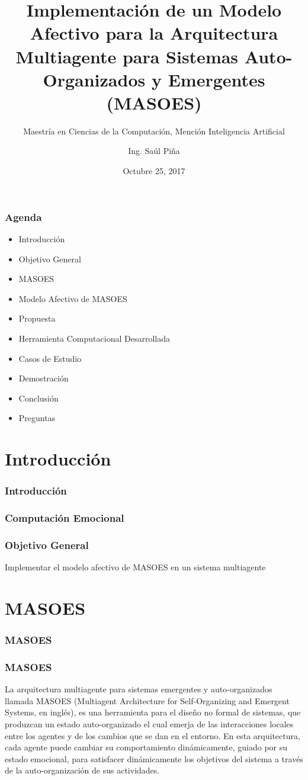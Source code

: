 \documentclass{beamer}
\title{Implementación de un Modelo Afectivo para la Arquitectura Multiagente para Sistemas Auto-Organizados y Emergentes (MASOES)}
\subtitle{Maestría en Ciencias de la Computación, Mención Inteligencia Artificial}
\author{Ing. Saúl Piña}
\date{Octubre 25, 2017}
\institute{\url{sauljabin@gmail.com}}
\begin{document}
\begin{frame}[plain,t]
\titlepage
\end{frame}

\begin{frame}
\frametitle{Agenda}
\begin{itemize}
\item Introducción
\item Objetivo General
\item MASOES
\item Modelo Afectivo de MASOES
\item Propuesta
\item Herramienta Computacional Desarrollada
\item Casos de Estudio
\item Demostración
\item Conclusión
\item Preguntas
\end{itemize}
\end{frame}

\section{Introducción}

\begin{frame}
\frametitle{Introducción}

\end{frame}

\begin{frame}
\frametitle{Computación Emocional}

\end{frame}

\begin{frame}
\frametitle{Objetivo General}
\huge
Implementar el modelo afectivo de MASOES en un sistema multiagente
\end{frame}

\section{MASOES}

\begin{frame}
\frametitle{MASOES}

\end{frame}

\begin{frame}
\frametitle{MASOES}
La arquitectura multiagente para sistemas emergentes y auto-organizados llamada
MASOES (Multiagent Architecture for Self-Organizing and Emergent Systems, en inglés),
es una herramienta para el diseño no
formal de sistemas, que produzcan un estado auto-organizado el cual emerja de
las interacciones locales entre los agentes y de los cambios que se dan en el
entorno. En esta arquitectura, cada agente puede cambiar su comportamiento
dinámicamente, guiado por su estado emocional, para satisfacer dinámicamente los
objetivos del sistema a través de la auto-organización de sus actividades.
\end{frame}
\end{document}
